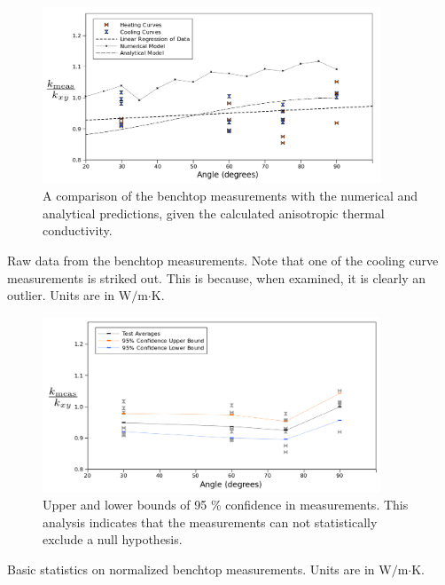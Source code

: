 \begin{figure}[h]
\centering
\includegraphics[width=0.9\textwidth]{fig/test_results.png}
\caption{A comparison of the benchtop measurements with the numerical and
analytical predictions, given the calculated anisotropic thermal conductivity.}
\label{fig:test_results}
\end{figure}

\begin{table}[h]
\centering

\caption{Raw data from the benchtop measurements. Note that one of the cooling curve measurements is striked out. This is because, when examined, it is clearly an outlier. Units are in W\(/\)m\(\cdot\)K.}
\label{tab:powders}
\end{table}


\begin{figure}[h]
\centering
\includegraphics[width=0.9\textwidth]{fig/test_results_confidence.png}
\caption{Upper and lower bounds of 95 \% confidence in measurements. This analysis 
indicates that the measurements can not statistically exclude a null hypothesis.}
\label{fig:test_confidence}
\end{figure}

\begin{table}[h]
\centering

\caption{Basic statistics on normalized benchtop measurements.  Units are in W\(/\)m\(\cdot\)K.}
\label{tab:pow-stats}
\end{table}


